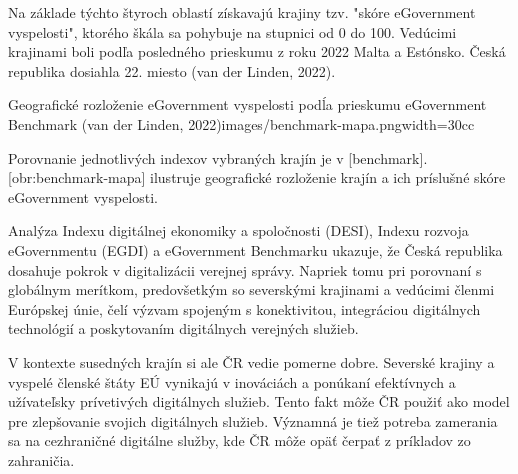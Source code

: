 Na základe týchto štyroch oblastí získavajú krajiny tzv. "skóre eGovernment vyspelosti", ktorého škála sa pohybuje na stupnici od 0 do 100. Vedúcimi krajinami boli podľa posledného prieskumu z roku 2022 Malta a Estónsko. Česká republika dosiahla 22. miesto \scr(van der Linden, 2022). 


\setupTABLE[frame=on]
\setupTABLE[row][first][background=color, backgroundcolor=lightgray, style=bold]
\setupTABLE[column][1][width=12cc]
\setupTABLE[column][2][width=6cc]
\setupTABLE[column][3][width=14cc]
\setupTABLE[r][each][align={middle,lohi}]


{Geografické rozloženie eGovernment vyspelosti podĺa prieskumu eGovernment Benchmark (van der Linden, 2022)}{images/benchmark-mapa.png}{width=30cc}

Porovnanie jednotlivých indexov vybraných krajín je v [benchmark]. [obr:benchmark-mapa] ilustruje geografické rozloženie krajín a ich príslušné skóre eGovernment vyspelosti.


Analýza Indexu digitálnej ekonomiky a spoločnosti (DESI), Indexu rozvoja eGovernmentu (EGDI) a eGovernment Benchmarku ukazuje, že Česká republika dosahuje pokrok v digitalizácii verejnej správy. Napriek tomu pri porovnaní s globálnym merítkom, predovšetkým so severskými krajinami a vedúcimi členmi Európskej únie, čelí výzvam spojeným s konektivitou, integráciou digitálnych technológií a poskytovaním digitálnych verejných služieb.

V kontexte susedných krajín si ale ČR vedie pomerne dobre. Severské krajiny a vyspelé členské štáty EÚ vynikajú v inováciách a ponúkaní efektívnych a užívateľsky prívetivých digitálnych služieb. Tento fakt môže ČR použiť ako model pre zlepšovanie svojich digitálnych služieb. Významná je tiež potreba zamerania sa na cezhraničné digitálne služby, kde ČR môže opäť čerpať z príkladov zo zahraničia.

